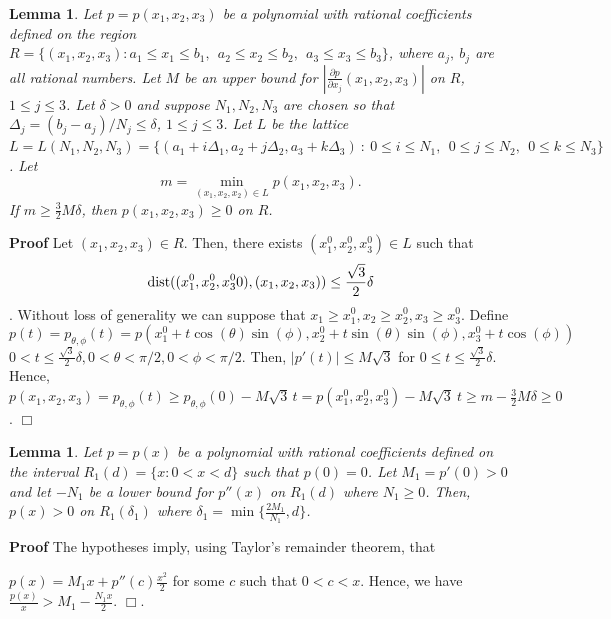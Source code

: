 \documentclass[12pt]{article}
\newcommand{\ds}{\displaystyle}
\newtheorem{lemma}[theorem]{Lemma}
\begin{document}
\begin{lemma}  \label{lem:poly3}
Let $p = p(x_1,x_2,x_3)$ be a polynomial with rational coefficients defined on the region 
$R = \{ (x_1,x_2,x_3) : a_1 \le x_1 \le b_1,\ \ a_2 \le x_2 \le b_2,\ \ a_3 \le x_3 \le b_3\}$, where $a_j,\ b_j$ are 
all rational numbers. Let $M$ be an upper bound for  ${\ds |\frac{\partial p}{\partial x_j}(x_1,x_2,x_3)|}$ on $R$, $1 \le j \le 3$.   
Let $\delta > 0 $ and suppose $N_1, N_2, N_3$ are chosen so that
$\Delta_j = (b_j-a_j)/N_j \le \delta$, $1 \le j \le 3$.  Let $L$ be the lattice
$L = L(N_1,N_2,N_3) = \{ (a_1 + i\Delta_1,a_2 + j\Delta_2,a_3 + k\Delta_3)\  :\  0 \le i \le N_1,\ \   0 \le j \le N_2,
\ \  0 \le k \le N_3\}$.
Let 
$$m = \min_{(x_1,x_2,x_2) \in L} p(x_1,x_2,x_3) . $$  
If $m \ge \frac{3}{2}M\delta$, then $p(x_1,x_2,x_3) \ge 0$ on $R$.
\end{lemma}
\textbf{Proof}
Let $(x_1,x_2,x_3) \in R$.  Then, there exists $(x_1^0,x_2^0,x_3^0) \in L$ such that 
$${\ds {\rm dist}( (x_1^0,x_2^0,x_3^00),(x_1,x_2,x_3) ) \le \frac{\sqrt{3}}{2}\delta}$$.  
Without loss of generality we can suppose that 
$x_1 \ge x_1^0, x_2 \ge x_2^0, x_3 \ge x_3^0$.
Define 
$$p(t) = p_{\theta,\phi}(t) = p(x_1^0+t\cos(\theta)\sin(\phi),x_2^0+t\sin(\theta)\sin(\phi),x_3^0+t\cos(\phi))$$ 
$0 < t \le \frac{\sqrt{3}}{2}\delta, 0 < \theta < \pi/2, 0 < \phi < \pi/2$.  Then, $\left | p'(t) \right | \le M\sqrt{3}$ for $0 \le t \le \frac{\sqrt{3}}{2}\delta$.
Hence, $p(x_1,x_2,x_3) = p_{\theta,\phi}(t) \ge p_{\theta,\phi}(0) - M\sqrt{3}\, t = p(x_1^0,x_2^0,x_3^0) - M \sqrt{3}\ t \ge m - \frac{3}{2}M \delta \ge 0$. $\Box$

\vspace{0.05in}

\begin{lemma} \label{lem:est1}
Let $p = p(x)$ be a polynomial with rational coefficients defined on the interval $R_1(d) = \{ x : 0 < x < d\}$ such
that $p(0) = 0$.  Let $M_1 = p'(0) > 0$ and let $-N_1$ be a lower bound for $p''(x)$ on $R_1(d)$ where $N_1 \ge 0$.  Then, $p(x) > 0$ on $R_1(\delta_1)$ where $\delta_1 = \min\{\frac{2 M_1}{N_1},d\}$.
\end{lemma}
\textbf{Proof}
The hypotheses imply, using Taylor's remainder theorem, that 

\noindent ${\ds p(x) = M_1 x + p''(c)\frac{x^2}{2} }$ for some $c$ such that $0 < c < x$.  Hence, we have ${\ds \frac{p(x)}{x} > M_1 - \frac{N_1 x}{2} }$.  $\Box$.

\end{document}
